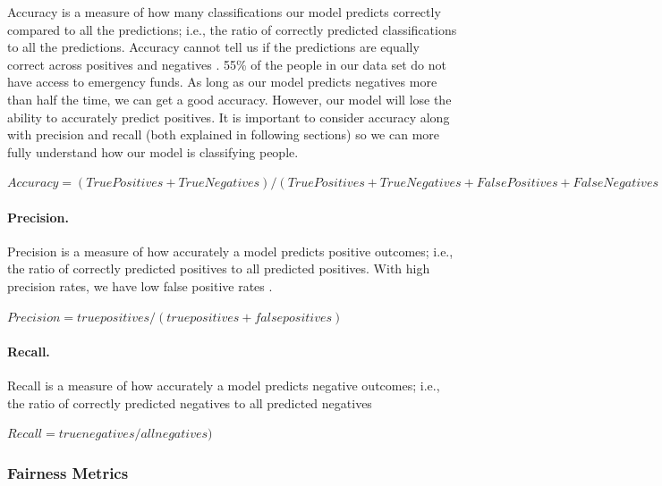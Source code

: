 \documentclass[water,article,submit,moreauthors,pdftex]{mdpi}
\begin{document}
Accuracy is a measure of how many classifications our model predicts
correctly compared to all the predictions; i.e., the ratio of correctly
predicted classifications to all the predictions. Accuracy cannot tell
us if the predictions are equally correct across positives and negatives
\citep{juba2019precision, gupta2021recall}. 55\% of the people in our
data set do not have access to emergency funds. As long as our model
predicts negatives more than half the time, we can get a good accuracy.
However, our model will lose the ability to accurately predict
positives. It is important to consider accuracy along with precision and
recall (both explained in following sections) so we can more fully
understand how our model is classifying people.

\(Accuracy = (True Positives + True Negatives) / (True Positives + True Negatives + False Positives + False Negatives)\)

\hypertarget{precision.}{%
\paragraph{Precision.}\label{precision.}}

Precision is a measure of how accurately a model predicts positive
outcomes; i.e., the ratio of correctly predicted positives to all
predicted positives. With high precision rates, we have low false
positive rates \citep{juba2019precision, gupta2021recall}.

\(Precision = true positives / (true positives + false positives)\)

\hypertarget{recall.}{%
\paragraph{Recall.}\label{recall.}}

Recall is a measure of how accurately a model predicts negative
outcomes; i.e., the ratio of correctly predicted negatives to all
predicted negatives\citep{gupta2021recall}

\(Recall = true negatives / all negatives)\)

\hypertarget{fairness-metrics}{%
\subsubsection{Fairness Metrics}\label{fairness-metrics}}
\end{document}
